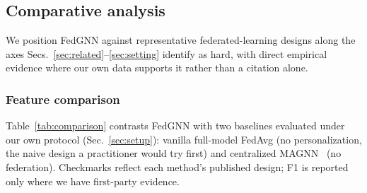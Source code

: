 \documentclass[journal]{IEEEtran}
\begin{document}
\subsection{Comparative analysis}
\label{sec:comparative}
We position FedGNN against representative federated-learning designs
along the axes Secs.~\ref{sec:related}--\ref{sec:setting} identify as
hard, with direct empirical evidence where our own data supports it
rather than a citation alone.

\subsubsection{Feature comparison}
Table~\ref{tab:comparison} contrasts FedGNN with two baselines
evaluated under our own protocol (Sec.~\ref{sec:setup}): vanilla
full-model FedAvg (no personalization, the naive design a practitioner
would try first) and centralized MAGNN~\cite{magnn} (no federation).
Checkmarks reflect each method's published design; F1 is reported only
where we have first-party evidence.
\end{document}
